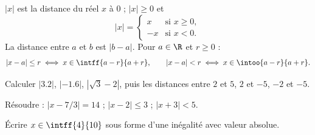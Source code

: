 \begin{keypoint}
$|x|$ est la distance du réel $x$ à $0$ ; $|x|\geq0$ et
\[|x|=\begin{cases}x&\text{si }x\geq0,\\-x&\text{si }x<0.\end{cases}\]
La distance entre $a$ et $b$ est $|b-a|$. Pour $a\in\R$ et $r\geq0$ :
\[|x-a|\leq r\iff x\in\intff{a-r}{a+r},\qquad |x-a|<r\iff x\in\intoo{a-r}{a+r}.\]
\end{keypoint}
\begin{example}Calculer $|\num{3,2}|$, $|-\num{1,6}|$, $|\sqrt3-2|$, puis les distances entre $2$ et $5$, $2$ et $-5$, $-2$ et $-5$.\end{example}
\begin{example}Résoudre : $|x-7/3|=14$ ; $|x-2|\leq3$ ; $|x+3|<5$.\end{example}
\begin{example}Écrire $x\in\intff{4}{10}$ sous forme d'une inégalité avec valeur absolue.\end{example}

